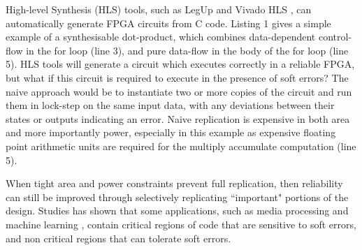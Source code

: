 \providecommand*{\lstnumberautorefname}{line}

High-level Synthesis (HLS) tools, such as LegUp \cite{canis2011legup} and Vivado HLS \cite{feist2012vivado},
can automatically generate FPGA circuits from C code.
Listing 1 gives a simple example of a synthesisable dot-product, which combines
data-dependent control-flow in the for loop (line 3), and pure data-flow
in the body of the for loop (line 5).
HLS tools will generate a circuit which executes correctly in a reliable FPGA, but what if
this circuit is required to execute in the presence of soft errors?
The naive approach would be to instantiate two or more copies of the circuit and run
them in lock-step on the same input data, with any deviations between their states or outputs
indicating an error.
Naive replication is expensive in both area and more importantly
power, especially in this example as expensive floating point arithmetic
units are required for the multiply accumulate computation (line 5).


When tight area and power constraints prevent full replication, then reliability can still be
improved through selectively replicating ``important" portions of the design.
Studies has shown that some applications, such as media processing
\cite{liu2012flikker} and machine learning \cite{wong2006soft}, contain critical regions
of code that are sensitive to soft errors,
and non critical regions that can tolerate soft errors.

